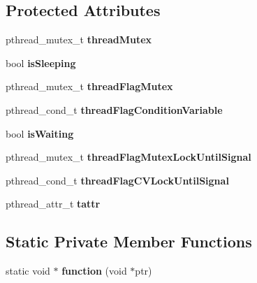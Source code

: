 \subsection*{Protected Attributes}
\begin{CompactItemize}
\item 
pthread\_\-mutex\_\-t {\bf threadMutex}\label{classbr_1_1ufscar_1_1lince_1_1ginga_1_1recommender_1_1Thread_fe8c0761626a30d702b31cc59c8e1c96}

\item 
bool {\bf isSleeping}\label{classbr_1_1ufscar_1_1lince_1_1ginga_1_1recommender_1_1Thread_0107cad432bc7adb4365aae01585ec08}

\item 
pthread\_\-mutex\_\-t {\bf threadFlagMutex}\label{classbr_1_1ufscar_1_1lince_1_1ginga_1_1recommender_1_1Thread_ded3d05f46100aaaefa06fc178086281}

\item 
pthread\_\-cond\_\-t {\bf threadFlagConditionVariable}\label{classbr_1_1ufscar_1_1lince_1_1ginga_1_1recommender_1_1Thread_71bcc220ba83ec08e8cfff08788d370a}

\item 
bool {\bf isWaiting}\label{classbr_1_1ufscar_1_1lince_1_1ginga_1_1recommender_1_1Thread_1e2abb81a8e1b0347d38032e9679e6e9}

\item 
pthread\_\-mutex\_\-t {\bf threadFlagMutexLockUntilSignal}\label{classbr_1_1ufscar_1_1lince_1_1ginga_1_1recommender_1_1Thread_2909d85ccca146820233357665a683eb}

\item 
pthread\_\-cond\_\-t {\bf threadFlagCVLockUntilSignal}\label{classbr_1_1ufscar_1_1lince_1_1ginga_1_1recommender_1_1Thread_9a89a8e60fae40a53795056e7cf06c87}

\item 
pthread\_\-attr\_\-t {\bf tattr}\label{classbr_1_1ufscar_1_1lince_1_1ginga_1_1recommender_1_1Thread_6019d18ded9352b09e572c4c90634848}

\end{CompactItemize}
\subsection*{Static Private Member Functions}
\begin{CompactItemize}
\item 
static void $\ast$ \textbf{function} (void $\ast$ptr)\label{classbr_1_1ufscar_1_1lince_1_1ginga_1_1recommender_1_1Thread_0fde000990b5486b709f151eb5024dc5}

\end{CompactItemize}
